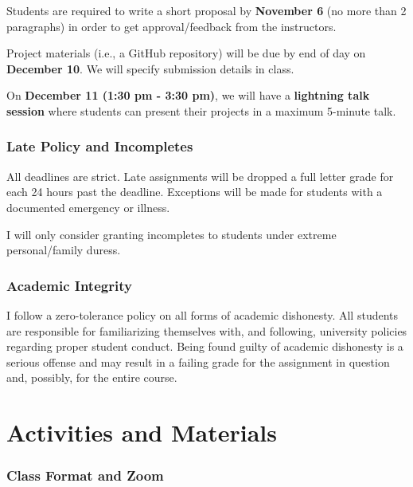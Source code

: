 \documentclass[
]{book}
\begin{document}
Students are required to write a short proposal by \textbf{November 6} (no more than 2 paragraphs) in order to get approval/feedback from the instructors.

Project materials (i.e., a GitHub repository) will be due by end of day on \textbf{December 10}. We will specify submission details in class.

On \textbf{December 11 (1:30 pm - 3:30 pm)}, we will have a \textbf{lightning talk session} where students can present their projects in a maximum 5-minute talk.

\hypertarget{late-policy-and-incompletes}{%
\subsubsection*{Late Policy and Incompletes}\label{late-policy-and-incompletes}}

All deadlines are strict. Late assignments will be dropped a full letter grade for each 24 hours past the deadline. Exceptions will be made for students with a documented emergency or illness.

I will only consider granting incompletes to students under extreme personal/family duress.

\hypertarget{academic-integrity}{%
\subsubsection*{Academic Integrity}\label{academic-integrity}}

I follow a zero-tolerance policy on all forms of academic dishonesty. All students are responsible for familiarizing themselves with, and following, university policies regarding proper student conduct. Being found guilty of academic dishonesty is a serious offense and may result in a failing grade for the assignment in question and, possibly, for the entire course.

\hypertarget{activities-and-materials}{%
\section{Activities and Materials}\label{activities-and-materials}}

\hypertarget{class-format-and-zoom}{%
\subsubsection*{Class Format and Zoom}\label{class-format-and-zoom}}
\end{document}
